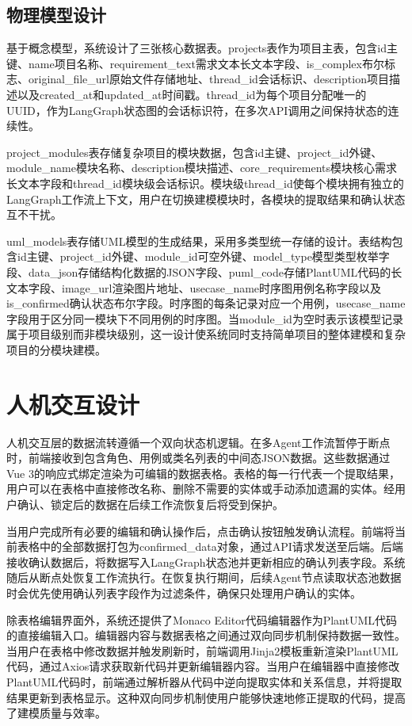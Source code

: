 \subsection{物理模型设计}

基于概念模型，系统设计了三张核心数据表。projects表作为项目主表，包含id主键、name项目名称、requirement\_text需求文本长文本字段、is\_complex布尔标志、original\_file\_url原始文件存储地址、thread\_id会话标识、description项目描述以及created\_at和updated\_at时间戳。thread\_id为每个项目分配唯一的UUID，作为LangGraph状态图的会话标识符，在多次API调用之间保持状态的连续性。

project\_modules表存储复杂项目的模块数据，包含id主键、project\_id外键、module\_name模块名称、description模块描述、core\_requirements模块核心需求长文本字段和thread\_id模块级会话标识。模块级thread\_id使每个模块拥有独立的LangGraph工作流上下文，用户在切换建模模块时，各模块的提取结果和确认状态互不干扰。

uml\_models表存储UML模型的生成结果，采用多类型统一存储的设计。表结构包含id主键、project\_id外键、module\_id可空外键、model\_type模型类型枚举字段、data\_json存储结构化数据的JSON字段、puml\_code存储PlantUML代码的长文本字段、image\_url渲染图片地址、usecase\_name时序图用例名称字段以及is\_confirmed确认状态布尔字段。时序图的每条记录对应一个用例，usecase\_name字段用于区分同一模块下不同用例的时序图。当module\_id为空时表示该模型记录属于项目级别而非模块级别，这一设计使系统同时支持简单项目的整体建模和复杂项目的分模块建模。

\section{人机交互设计}

人机交互层的数据流转遵循一个双向状态机逻辑。在多Agent工作流暂停于断点时，前端接收到包含角色、用例或类名列表的中间态JSON数据。这些数据通过Vue 3的响应式绑定渲染为可编辑的数据表格。表格的每一行代表一个提取结果，用户可以在表格中直接修改名称、删除不需要的实体或手动添加遗漏的实体。经用户确认、锁定后的数据在后续工作流恢复后将受到保护。

当用户完成所有必要的编辑和确认操作后，点击确认按钮触发确认流程。前端将当前表格中的全部数据打包为confirmed\_data对象，通过API请求发送至后端。后端接收确认数据后，将数据写入LangGraph状态池并更新相应的确认列表字段。系统随后从断点处恢复工作流执行。在恢复执行期间，后续Agent节点读取状态池数据时会优先使用确认列表字段作为过滤条件，确保只处理用户确认的实体。

除表格编辑界面外，系统还提供了Monaco Editor代码编辑器作为PlantUML代码的直接编辑入口。编辑器内容与数据表格之间通过双向同步机制保持数据一致性。当用户在表格中修改数据并触发刷新时，前端调用Jinja2模板重新渲染PlantUML代码，通过Axios请求获取新代码并更新编辑器内容。当用户在编辑器中直接修改PlantUML代码时，前端通过解析器从代码中逆向提取实体和关系信息，并将提取结果更新到表格显示。这种双向同步机制使用户能够快速地修正提取的代码，提高了建模质量与效率。

